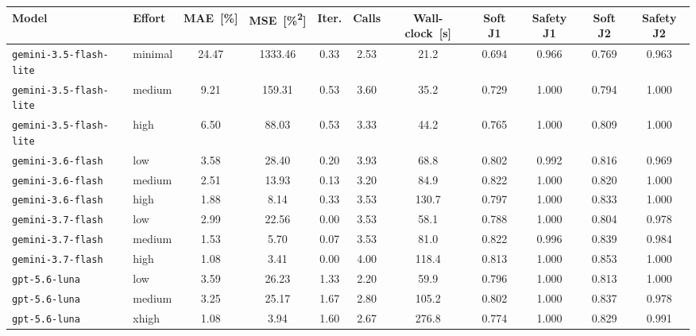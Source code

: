 \begin{tabular}{llS[table-format=2.2]S[table-format=4.2]S[table-format=1.2]S[table-format=1.2]S[table-format=3.1]S[table-format=1.3]S[table-format=1.3]S[table-format=1.3]S[table-format=1.3]}
\toprule
Model & Effort & {MAE~[\%]} & {MSE~[\unit{\percent\squared}]} & {Iter.} & {Calls} & {Wall-clock~[s]} & {Soft J1} & {Safety J1} & {Soft J2} & {Safety J2} \\
\midrule
\texttt{gemini-3.5-flash-lite} & minimal & 24.47 & 1333.46 & 0.33 & 2.53 & 21.2 & 0.694 & 0.966 & 0.769 & 0.963 \\
\texttt{gemini-3.5-flash-lite} & medium & 9.21 & 159.31 & 0.53 & 3.60 & 35.2 & 0.729 & 1.000 & 0.794 & 1.000 \\
\texttt{gemini-3.5-flash-lite} & high & 6.50 & 88.03 & 0.53 & 3.33 & 44.2 & 0.765 & 1.000 & 0.809 & 1.000 \\
\texttt{gemini-3.6-flash} & low & 3.58 & 28.40 & 0.20 & 3.93 & 68.8 & 0.802 & 0.992 & 0.816 & 0.969 \\
\texttt{gemini-3.6-flash} & medium & 2.51 & 13.93 & 0.13 & 3.20 & 84.9 & 0.822 & 1.000 & 0.820 & 1.000 \\
\texttt{gemini-3.6-flash} & high & 1.88 & 8.14 & 0.33 & 3.53 & 130.7 & 0.797 & 1.000 & 0.833 & 1.000 \\
\texttt{gemini-3.7-flash} & low & 2.99 & 22.56 & 0.00 & 3.53 & 58.1 & 0.788 & 1.000 & 0.804 & 0.978 \\
\texttt{gemini-3.7-flash} & medium & 1.53 & 5.70 & 0.07 & 3.53 & 81.0 & 0.822 & 0.996 & 0.839 & 0.984 \\
\texttt{gemini-3.7-flash} & high & 1.08 & 3.41 & 0.00 & 4.00 & 118.4 & 0.813 & 1.000 & 0.853 & 1.000 \\
\texttt{gpt-5.6-luna} & low & 3.59 & 26.23 & 1.33 & 2.20 & 59.9 & 0.796 & 1.000 & 0.813 & 1.000 \\
\texttt{gpt-5.6-luna} & medium & 3.25 & 25.17 & 1.67 & 2.80 & 105.2 & 0.802 & 1.000 & 0.837 & 0.978 \\
\texttt{gpt-5.6-luna} & xhigh & 1.08 & 3.94 & 1.60 & 2.67 & 276.8 & 0.774 & 1.000 & 0.829 & 0.991 \\
\bottomrule
\end{tabular}
